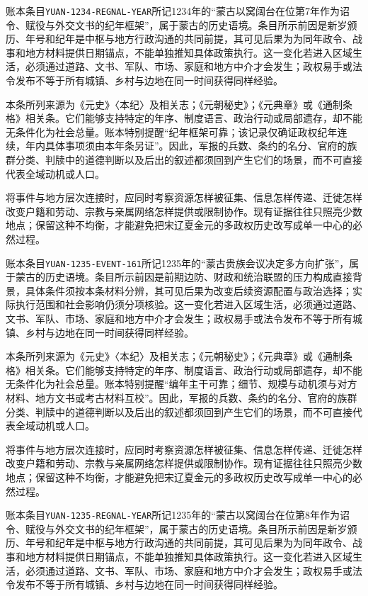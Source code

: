 账本条目\texttt{YUAN-1234-REGNAL-YEAR}所记1234年的“蒙古以窝阔台在位第7年作为诏令、赋役与外交文书的纪年框架”，属于蒙古的历史语境。条目所示前因是新岁颁历、年号和纪年是中枢与地方行政沟通的共同前提，其可见后果为为同年政令、战事和地方材料提供日期锚点，不能单独推知具体政策执行。这一变化若进入区域生活，必须通过道路、文书、军队、市场、家庭和地方中介才会发生；政权易手或法令发布不等于所有城镇、乡村与边地在同一时间获得同样经验。

本条所列来源为《元史》〈本纪〉及相关志；《元朝秘史》；《元典章》或《通制条格》相关条。它们能够支持特定的年序、制度语言、政治行动或局部遗存，却不能无条件化为社会总量。账本特别提醒“纪年框架可靠；该记录仅确证政权纪年连续，年内具体事项须由本年条另证”。因此，军报的兵数、条约的名分、官府的族群分类、判牍中的道德判断以及后出的叙述都须回到产生它们的场景，而不可直接代表全域动机或人口。

将事件与地方层次连接时，应同时考察资源怎样被征集、信息怎样传递、迁徙怎样改变户籍和劳动、宗教与亲属网络怎样提供或限制协作。现有证据往往只照亮少数地点；保留这种不均衡，才能避免把宋辽夏金元的多政权历史改写成单一中心的必然过程。

账本条目\texttt{YUAN-1235-EVENT-161}所记1235年的“蒙古贵族会议决定多方向扩张”，属于蒙古的历史语境。条目所示前因是前期边防、财政和统治联盟的压力构成直接背景，具体条件须按本条材料分辨，其可见后果为改变后续资源配置与政治选择；实际执行范围和社会影响仍须分项核验。这一变化若进入区域生活，必须通过道路、文书、军队、市场、家庭和地方中介才会发生；政权易手或法令发布不等于所有城镇、乡村与边地在同一时间获得同样经验。

本条所列来源为《元史》〈本纪〉及相关志；《元朝秘史》；《元典章》或《通制条格》相关条。它们能够支持特定的年序、制度语言、政治行动或局部遗存，却不能无条件化为社会总量。账本特别提醒“编年主干可靠；细节、规模与动机须与对方材料、地方文书或考古材料互校”。因此，军报的兵数、条约的名分、官府的族群分类、判牍中的道德判断以及后出的叙述都须回到产生它们的场景，而不可直接代表全域动机或人口。

将事件与地方层次连接时，应同时考察资源怎样被征集、信息怎样传递、迁徙怎样改变户籍和劳动、宗教与亲属网络怎样提供或限制协作。现有证据往往只照亮少数地点；保留这种不均衡，才能避免把宋辽夏金元的多政权历史改写成单一中心的必然过程。

账本条目\texttt{YUAN-1235-REGNAL-YEAR}所记1235年的“蒙古以窝阔台在位第8年作为诏令、赋役与外交文书的纪年框架”，属于蒙古的历史语境。条目所示前因是新岁颁历、年号和纪年是中枢与地方行政沟通的共同前提，其可见后果为为同年政令、战事和地方材料提供日期锚点，不能单独推知具体政策执行。这一变化若进入区域生活，必须通过道路、文书、军队、市场、家庭和地方中介才会发生；政权易手或法令发布不等于所有城镇、乡村与边地在同一时间获得同样经验。

